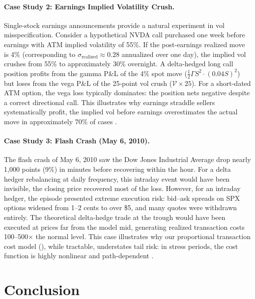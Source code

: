 \documentclass[11pt,a4paper]{article}
\begin{document}
\paragraph{Case Study 2: Earnings Implied Volatility Crush.}
Single-stock earnings announcements provide a natural experiment in vol misspecification. Consider a hypothetical NVDA call purchased one week before earnings with ATM implied volatility of 55\%. If the post-earnings realized move is 4\% (corresponding to $\sigma_{\text{realized}} \approx 0.28$ annualized over one day), the implied vol crushes from 55\% to approximately 30\% overnight. A delta-hedged long call position profits from the gamma P\&L of the 4\% spot move ($\frac{1}{2}\Gamma S^2 \cdot (0.04S)^2$) but loses from the vega P\&L of the 25-point vol crush ($\mathcal{V} \times 25$). For a short-dated ATM option, the vega loss typically dominates: the position nets negative despite a correct directional call. This illustrates why earnings straddle sellers systematically profit, the implied vol before earnings overestimates the actual move in approximately 70\% of cases \citep{sinclair2010option}.

\paragraph{Case Study 3: Flash Crash (May 6, 2010).}
The flash crash of May 6, 2010 saw the Dow Jones Industrial Average drop nearly 1,000 points (9\%) in minutes before recovering within the hour. For a delta hedger rebalancing at daily frequency, this intraday event would have been invisible, the closing price recovered most of the loss. However, for an intraday hedger, the episode presented extreme execution risk: bid--ask spreads on SPX options widened from 1--2 cents to over \$5, and many quotes were withdrawn entirely. The theoretical delta-hedge trade at the trough would have been executed at prices far from the model mid, generating realized transaction costs 100--500$\times$ the normal level. This case illustrates why our proportional transaction cost model (), while tractable, understates tail risk: in stress periods, the cost function is highly nonlinear and path-dependent \citep{taleb1997dynamic}.



\section{Conclusion}\label{sec:conclusion}
\end{document}
